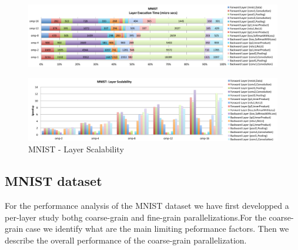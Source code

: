 
\begin{figure}[]
\includegraphics[width=\linewidth]{figures/mnist-rel-abs-time.pdf}
\caption{}
\end{figure}

\begin{figure}[]
\includegraphics[width=\textwidth]{figures/mnist-scalability-layer.pdf}
\caption{MNIST - Layer Scalability}
\end{figure}

\subsection{MNIST dataset}
For the performance analysis of the MNIST dataset we have first 
developped a per-layer study bothg coarse-grain and fine-grain parallelizations.For the coarse-grain case we identify what are the main limiting 
peformance factors. Then we describe the overall performance of the 
coarse-grain parallelization. 

